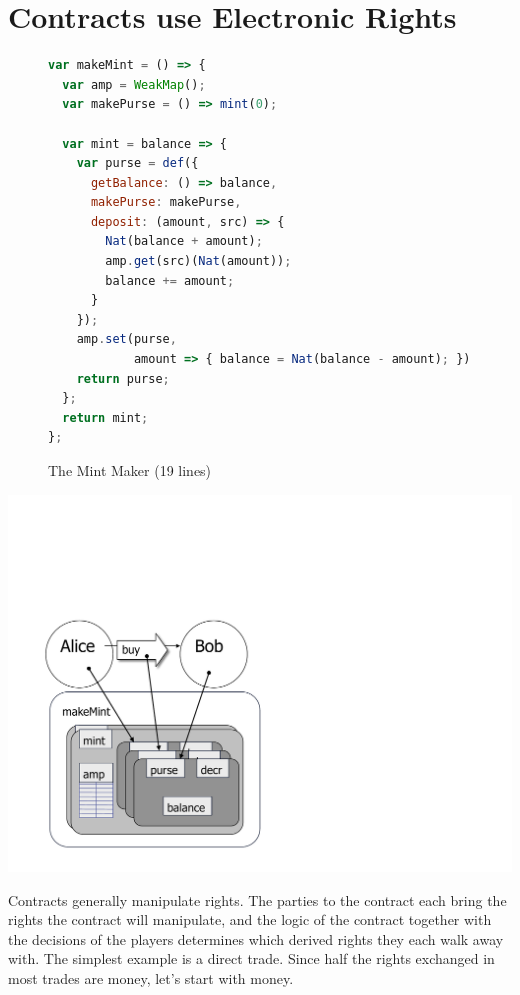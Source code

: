 \documentclass{llncs}
\begin{document}
\section{Contracts use Electronic Rights}

\begin{figure}[htbp]
\begin{center}
\begin{lstlisting}[language=javascript]
var makeMint = () => {
  var amp = WeakMap();
  var makePurse = () => mint(0);
  
  var mint = balance => {
    var purse = def({
      getBalance: () => balance,
      makePurse: makePurse,
      deposit: (amount, src) => {
        Nat(balance + amount);
        amp.get(src)(Nat(amount)); 
        balance += amount; 
      } 
    });
    amp.set(purse, 
            amount => { balance = Nat(balance - amount); });
    return purse;
  };
  return mint;
};
\end{lstlisting}
\caption{The Mint Maker (19 lines)}
\label{makeMint}
\end{center}
\end{figure}

\includegraphics[scale=0.3]{bw-mint.pdf}


Contracts generally manipulate rights. The parties to the contract each bring the rights the contract will manipulate, and the logic of the contract together with the decisions of the players determines which derived rights they each walk away with. The simplest example is a direct trade. Since half the rights exchanged in most trades are money, let's start with money. 
\end{document}
